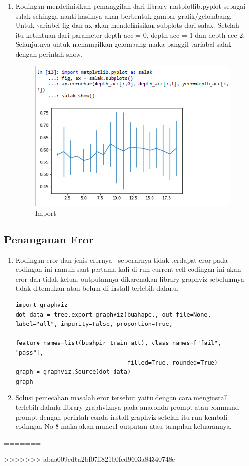 \begin{enumerate}
\item Kodingan mendefinisikan pemanggilan dari library matplotlib.pyplot sebagai salak sehingga nanti hasilnya akan berbentuk gambar grafik/gelombang. Untuk variabel fig dan ax akan mendefinisikan subplots dari salak. Setelah itu ketentuan dari parameter depth acc = 0, depth acc = 1 dan depth acc 2. Selanjutnya untuk menampilkan gelombang maka panggil variabel salak dengan perintah show.
\begin{figure}[ht]
\centering
\includegraphics[scale=0.5]{figures/no12.png}
\caption{Import}
\label{Hasil}
\end{figure}
\end{enumerate}

\subsection{Penanganan Eror}
\begin{enumerate}
\item Kodingan eror dan jenis erornya : sebenarnya tidak terdapat eror pada codingan ini namun saat pertama kali di run current cell codingan ini akan eror dan tidak keluar outputannya dikarenakan library graphviz sebelumnya tidak ditemukan atau belum di install terlebih dahulu.
\subitem 
\begin{verbatim}
import graphviz
dot_data = tree.export_graphviz(buahapel, out_file=None, label="all", impurity=False, proportion=True,
                                feature_names=list(buahpir_train_att), class_names=["fail", "pass"], 
                                filled=True, rounded=True)
graph = graphviz.Source(dot_data)
graph
\end{verbatim}
\item Solusi pemecahan masalah eror tersebut yaitu dengan cara menginstall terlebih dahulu library graphviznya pada anaconda prompt atau command prompt dengan perintah conda install graphviz setelah itu run kembali codingan No 8 maka akan muncul outputan atau tampilan keluarannya.
\end{enumerate}

 
=======
 

>>>>>>> abaa009ed6a2bf07ff821b0fed9603a84340748c
